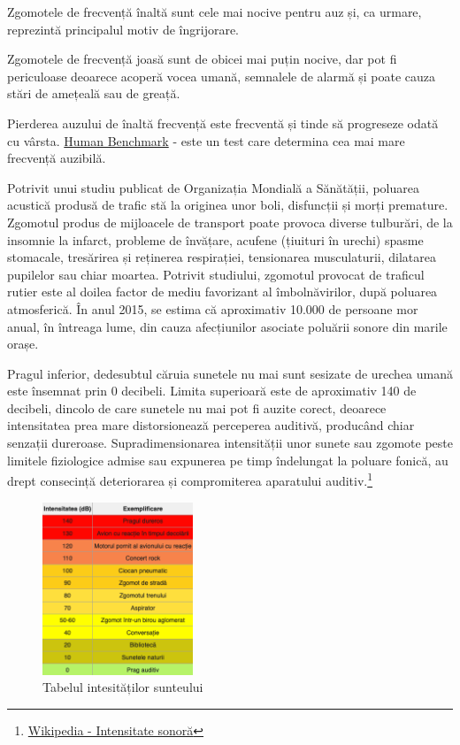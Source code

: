 Zgomotele de frecvență înaltă sunt cele mai nocive pentru auz și, ca urmare, reprezintă principalul motiv de îngrijorare.

Zgomotele de frecvență joasă sunt de obicei mai puțin nocive, dar pot fi periculoase deoarece acoperă vocea umană, semnalele de alarmă și poate cauza stări de amețeală sau de greață.

Pierderea auzului de înaltă frecvență este frecventă și tinde să progreseze odată cu vârsta. \href{https://web.archive.org/web/20201107234502if_/https://www.humanbenchmark.com/tests/hearing}{Human Benchmark} - este un test care determina cea mai mare frecvență auzibilă.

Potrivit unui studiu publicat de Organizația Mondială a Sănătății, poluarea acustică produsă de trafic stă la originea unor boli, disfuncții și morți premature. Zgomotul produs de mijloacele de transport poate provoca diverse tulburări, de la insomnie la infarct, probleme de învățare, acufene (țiuituri în urechi) spasme stomacale, tresărirea și reținerea respirației, tensionarea musculaturii, dilatarea pupilelor sau chiar moartea. Potrivit studiului, zgomotul provocat de traficul rutier este al doilea factor de mediu favorizant al îmbolnăvirilor, după poluarea atmosferică. În anul 2015, se estima că aproximativ 10.000 de persoane mor anual, în întreaga lume, din cauza afecțiunilor asociate poluării sonore din marile orașe.

Pragul inferior, dedesubtul căruia sunetele nu mai sunt sesizate de urechea umană este însemnat prin 0 decibeli. Limita superioară este de aproximativ 140 de decibeli, dincolo de care sunetele nu mai pot fi auzite corect, deoarece intensitatea prea mare distorsionează perceperea auditivă, producând chiar senzații dureroase. Supradimensionarea intensității unor sunete sau zgomote peste limitele fiziologice admise sau expunerea pe timp îndelungat la poluare fonică, au drept consecință deteriorarea și compromiterea aparatului auditiv.\footnote{\href{https://ro.wikipedia.org/wiki/Intensitate_sonoră}{Wikipedia - Intensitate sonoră}}

\begin{figure}[h]
    \centering
    \includegraphics[width=0.4\textwidth]{db_table}
    \caption{Tabelul intesităților sunteului}
    \label{fig:mesh1}
\end{figure}

